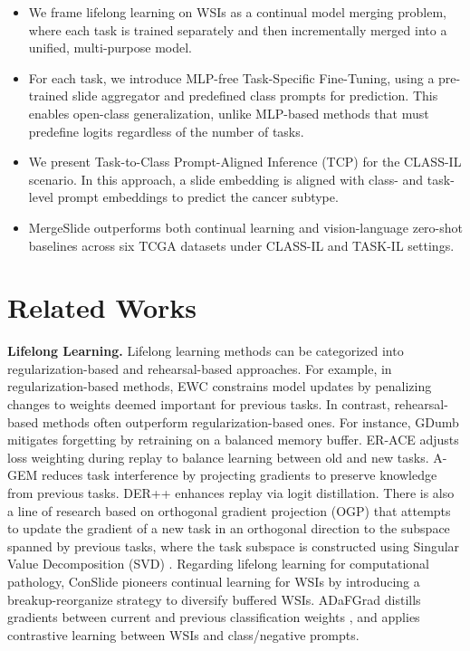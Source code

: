 \documentclass[10pt,twocolumn,letterpaper]{article}
\begin{document}
\begin{itemize}
\item We frame lifelong learning on WSIs as a continual model merging problem, where each task is trained separately and then incrementally merged into a unified, multi-purpose model.
\item For each task, we introduce MLP-free Task-Specific Fine-Tuning, using a pre-trained slide aggregator and predefined class prompts for prediction. {This enables open-class generalization, unlike MLP-based methods that must predefine logits regardless of the number of tasks.}
\item We present {Task-to-Class Prompt-Aligned Inference (TCP)} for the CLASS-IL scenario. In this approach, a slide embedding is aligned with class- and task-level prompt embeddings to predict the cancer subtype.
\item MergeSlide outperforms both continual learning and vision-language zero-shot baselines across six TCGA datasets under CLASS-IL and TASK-IL settings.
\end{itemize}


\section{Related Works}
\label{sec:relatedwork}
\noindent\textbf{Lifelong Learning.} Lifelong learning methods can be categorized into regularization-based and rehearsal-based approaches. For example, in regularization-based methods, EWC \cite{kirkpatrick2017overcoming} constrains model updates by penalizing changes to weights deemed important for previous tasks. In contrast, rehearsal-based methods often outperform regularization-based ones. For instance, GDumb \cite{gdumb} mitigates forgetting by retraining on a balanced memory buffer. ER-ACE \cite{erace} adjusts loss weighting during replay to balance learning between old and new tasks. A-GEM \cite{agem} reduces task interference by projecting gradients to preserve knowledge from previous tasks. DER++ \cite{derpp} enhances replay via logit distillation. There is also a line of research based on orthogonal gradient projection (OGP) that attempts to update the gradient of a new task in an orthogonal direction to the subspace spanned by previous tasks, where the task subspace is constructed using Singular Value Decomposition (SVD) \cite{lin2022trgp,yang2025revisiting}. Regarding lifelong learning for computational pathology, ConSlide \cite{huang2023conslide} pioneers continual learning for WSIs by introducing a breakup-reorganize strategy to diversify buffered WSIs. ADaFGrad \cite{adafgrad} distills gradients between current and previous classification weights \cite{du2020agree}, and applies contrastive learning between WSIs and class/negative prompts.
\end{document}
